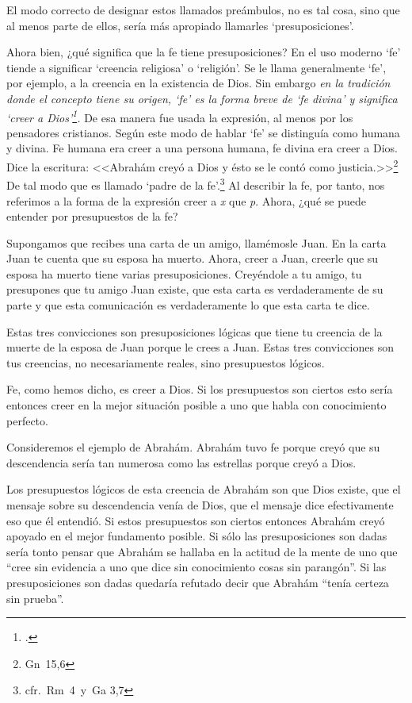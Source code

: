 \documentclass[10pt]{article}
\begin{document}
El modo correcto de designar estos llamados preámbulos, no es tal cosa, sino
que al menos parte de ellos, sería más apropiado llamarles `presuposiciones'.

Ahora bien, ¿qué significa que la fe tiene presuposiciones? En el uso moderno
`fe' tiende a significar `creencia religiosa' o `religión'. Se le llama
generalmente `fe', por ejemplo, a la creencia en la existencia de Dios. Sin
embargo \emph{en la tradición donde el concepto tiene su origen, `fe' es la
  forma breve de `fe divina' y significa `creer a Dios'\footcite{belief}.} De
esa manera fue usada la expresión, al menos por los pensadores cristianos. Según
este modo de hablar `fe' se distinguía como humana y divina. Fe humana era creer
a una persona humana, fe divina era creer a Dios. Dice la escritura: <<Abrahám
creyó a Dios y ésto se le contó como justicia.>>\footnote{Gn~15,6} De tal modo
que es llamado `padre de la fe'.\footnote{cfr.~Rm~4~y~Ga 3,7}
Al describir la fe, por tanto, nos referimos a la forma de la expresión creer a
\emph{x} que \emph{p}. Ahora, ¿qué se puede entender por presupuestos de la fe?

Supongamos que recibes una carta de un amigo, llamémosle Juan. En la carta Juan
te cuenta que su esposa ha muerto. Ahora, creer a Juan, creerle que su esposa ha
muerto tiene varias presuposiciones. Creyéndole a tu amigo, tu presupones que tu
amigo Juan existe, que esta carta es verdaderamente de su parte y que esta
comunicación es verdaderamente lo que esta carta te dice.

Estas tres convicciones son presuposiciones lógicas que tiene tu creencia de la
muerte de la esposa de Juan porque le crees a Juan. Estas tres convicciones son
tus creencias, no necesariamente reales, sino presupuestos lógicos.

Fe, como hemos dicho, es creer a Dios. Si los presupuestos son ciertos esto
sería entonces creer en la mejor situación posible a uno que habla con
conocimiento perfecto.

Consideremos el ejemplo de Abrahám. Abrahám tuvo fe porque creyó que su
descendencia sería tan numerosa como las estrellas porque creyó a Dios.

Los presupuestos lógicos de esta creencia de Abrahám son que Dios existe,
que el mensaje sobre su descendencia venía de Dios, que el mensaje dice
efectivamente eso que él entendió. Si estos presupuestos son ciertos
entonces Abrahám creyó apoyado en el mejor fundamento posible. Si sólo las
presuposiciones son dadas sería tonto pensar que Abrahám se hallaba en la
actitud de la mente de uno que ``cree sin evidencia a uno que dice sin
conocimiento cosas sin parangón''. Si las presuposiciones son dadas quedaría
refutado decir que Abrahám ``tenía certeza sin prueba''.
\end{document}
